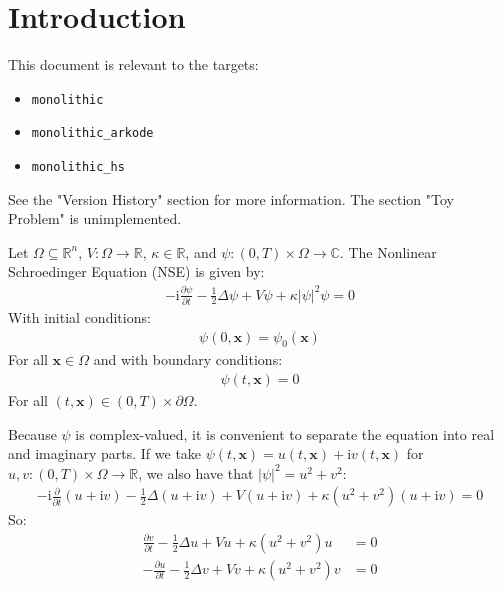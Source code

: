 \documentclass{article}
\newcommand{\bvec}[1]{\boldsymbol{#1}}
\newcommand{\ii}{\mathrm{i}}
\begin{document}
\section{Introduction}

This document is relevant to the targets:
\begin{itemize}
    \item \texttt{monolithic}
    \item \texttt{monolithic\_arkode}
    \item \texttt{monolithic\_hs}
\end{itemize}
See the "Version History" section for more information.
The section "Toy Problem" is unimplemented.

Let $\Omega \subseteq \mathbb{R}^n$,
$V : \Omega \rightarrow \mathbb{R}$,
$\kappa \in \mathbb{R}$,
and $\psi : (0, T) \times \Omega \rightarrow \mathbb{C}$.
The Nonlinear Schroedinger Equation (NSE) is given by:
\begin{align*}
-\ii \frac{\partial \psi}{\partial t} - \frac{1}{2} \Delta \psi + V \psi + \kappa |\psi|^2 \psi = 0
\end{align*}
\noindent With initial conditions:
\begin{align*}
\psi(0, \bvec{x}) = \psi_0(\bvec{x})
\end{align*}
\noindent For all $\bvec{x} \in \Omega$ and with boundary conditions:
\begin{align*}
\psi(t, \bvec{x}) = 0
\end{align*}
\noindent For all $(t, \bvec{x}) \in (0, T) \times \partial \Omega$.

Because $\psi$ is complex-valued, it is convenient to separate the equation into real and imaginary parts.
If we take $\psi(t, \bvec{x}) = u(t, \bvec{x}) + \ii v(t, \bvec{x})$
for $u, v : (0, T) \times \Omega \rightarrow \mathbb{R}$,
we also have that $|\psi|^2 = u^2 + v^2$:
\begin{align*}
    -\ii \frac{\partial}{\partial t} (u + \ii v) - \frac{1}{2} \Delta (u + \ii v)
            + V (u + \ii v) + \kappa (u^2 + v^2) (u + \ii v)
        = 0
\end{align*}
\noindent So:
\begin{align*}
    \frac{\partial v}{\partial t} - \frac{1}{2} \Delta u + V u + \kappa (u^2 + v^2) u & = 0 \\
    -\frac{\partial u}{\partial t} - \frac{1}{2} \Delta v + V v + \kappa (u^2 + v^2) v & = 0
\end{align*}

\newpage
\end{document}
